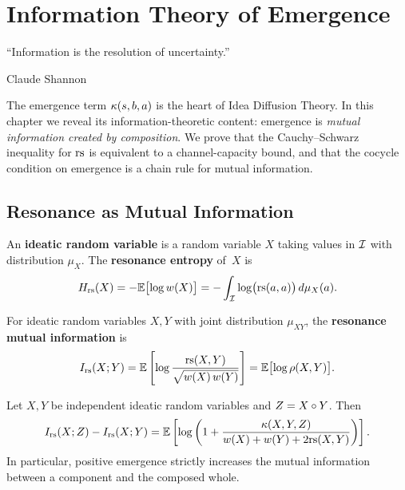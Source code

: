 
\chapter{Information Theory of Emergence}
\label{ch:information}

\epigraph{``Information is the resolution of uncertainty.''}{Claude Shannon}

The emergence term $\kappa(s,b,a)$ is the heart of Idea Diffusion
Theory.  In this chapter we reveal its information-theoretic
content: emergence is \emph{mutual information created by
composition}.  We prove that the Cauchy--Schwarz inequality for
$\mathrm{rs}$ is equivalent to a channel-capacity bound, and that the
cocycle condition on emergence is a chain rule for mutual
information.

\section{Resonance as Mutual Information}
\label{sec:resonance-info}

\begin{definition}
\label{def:ideatic-rv}
An \textbf{ideatic random variable} is a random variable $X$
taking values in $\mathcal{I}$ with distribution $\mu_X$.  The
\textbf{resonance entropy} of~$X$ is
\[
  H_{\mathrm{rs}}(X) = -\mathbb{E}\bigl[\log w(X)\bigr]
  = -\int_{\mathcal{I}} \log\bigl(\mathrm{rs}(a,a)\bigr)\, d\mu_X(a).
\]
\end{definition}

\begin{definition}
\label{def:rmi}
For ideatic random variables $X, Y$ with joint distribution
$\mu_{XY}$, the \textbf{resonance mutual information} is
\[
  I_{\mathrm{rs}}(X;Y) =
  \mathbb{E}\left[
    \log \frac{\mathrm{rs}(X,Y)}{\sqrt{w(X)\,w(Y)}}
  \right]
  = \mathbb{E}\bigl[\log \rho(X,Y)\bigr].
\]
\end{definition}

\begin{theorem}
\label{thm:emergence-info}
Let $X, Y$ be independent ideatic random variables and
$Z = X \circ Y$.  Then
\[
  I_{\mathrm{rs}}(X;Z) - I_{\mathrm{rs}}(X;Y)
  = \mathbb{E}\left[
    \log\left(1 + \frac{\kappa(X,Y,Z)}{w(X)+w(Y)+2\mathrm{rs}(X,Y)}\right)
  \right].
\]
In particular, positive emergence strictly increases the mutual
information between a component and the composed whole.
\end{theorem}

